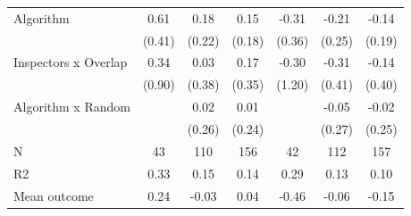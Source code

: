\begin{tabular}{lccc|ccc}
Algorithm   &        0.61         &        0.18         &        0.15         &       -0.31         &       -0.21         &       -0.14         \\
            &      (0.41)         &      (0.22)         &      (0.18)         &      (0.36)         &      (0.25)         &      (0.19)         \\
\addlinespace
Inspectors x Overlap&        0.34         &        0.03         &        0.17         &       -0.30         &       -0.31         &       -0.14         \\
            &      (0.90)         &      (0.38)         &      (0.35)         &      (1.20)         &      (0.41)         &      (0.40)         \\
\addlinespace
Algorithm x Random&                     &        0.02         &        0.01         &                     &       -0.05         &       -0.02         \\
            &                     &      (0.26)         &      (0.24)         &                     &      (0.27)         &      (0.25)         \\
\midrule
N           &          43         &         110         &         156         &          42         &         112         &         157         \\
R2          &        0.33         &        0.15         &        0.14         &        0.29         &        0.13         &        0.10         \\
Mean outcome&        0.24         &       -0.03         &        0.04         &       -0.46         &       -0.06         &       -0.15         \\
\bottomrule \end{tabular}
